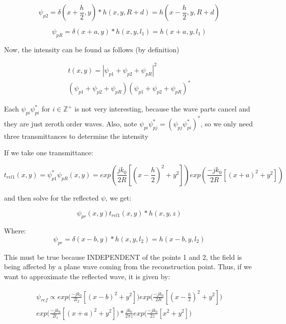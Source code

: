 \documentclass[12pt]{article}
\begin{document}
\begin{equation}
	\psi_{p2} = \delta(x + \frac{h}{2},y)*h(x,y,R + d) =
	h(x - \frac{h}{2},y,R + d)
\end{equation}

\begin{equation}
	\psi_{pR} = \delta(x + a,y)*h(x,y,l_{1}) = h(x + a,y,l_{1})
\end{equation}

Now, the intensity can be found as follows (by definition)

\begin{equation}
	\begin{multlined}
	t(x,y) = |\psi_{p1} + \psi_{p2} + \psi_{pR}|^2
	\\ (\psi_{p1} + \psi_{p2} + \psi_{pR})(\psi_{p1} + \psi_{p2} + \psi_{pR})^*
	\end{multlined}
\end{equation}

Each \(\psi_{pi}\psi_{pi}^*\) for \(i \in \mathbb{Z}^+\) is not very interesting, because the wave parts cancel and they are just zeroth order waves.
Also, note \(\psi_{pi}\psi_{pj}^* = (\psi_{pj}\psi_{pi}^*)^* \), so we only need three transmittances to determine the intensity

If we take one transmittance:

\begin{equation}
	t_{rel1}(x,y) = \psi_{p1}^*\psi_{pR}(x,y) = exp(\frac{jk_{0}}{2R}[(x - \frac{h}{2})^2 + y^2])exp(\frac{-jk_{0}}{2R}[(x + a)^2 + y^2])
\end{equation}

and then solve for the reflected \(\psi\), we get:

\begin{equation}
	\psi_{pr}(x,y)t_{rel1}(x,y)*h(x,y,z)
\end{equation}

Where:
\begin{equation}
	\psi_{pr} = \delta(x - b,y)*h(x,y,l_{2}) = h(x - b,y,l_{2})
\end{equation}

This must be true because INDEPENDENT of the points 1 and 2, the field is being
affected by a plane wave coming from the reconstruction point. Thus, if we want to
approximate the reflected wave, it is given by:

\begin{equation}
	\begin{multlined}
	\psi_{ref} \propto exp\bigg(\frac{-jk_{0}}{2l_{2}}[(x - b)^2 + y^2]\bigg)
	exp\bigg(\frac{-jk_{0}}{2R}[(x - \frac{h}{2})^2 + y^2]\bigg)
	\\exp\bigg(\frac{-jk_{0}}{2l_{1}}[(x + a)^2 + y^2]\bigg)
	*\frac{jk_{0}}{2\pi z}exp\bigg(\frac{-jk_{0}}{2z}[x^2 + y^2]\bigg)
	\end{multlined}
\end{equation}
\end{document}
